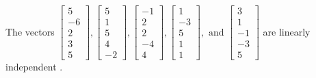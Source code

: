 \begin{exercise}
\begin{exerciseStatement}
  \end{exerciseStatement}
  \begin{exerciseAnswer}
   The vectors \(\left[\begin{array}{r}
5 \\
-6 \\
2 \\
3 \\
5
\end{array}\right] , \left[\begin{array}{r}
5 \\
1 \\
5 \\
4 \\
-2
\end{array}\right] , \left[\begin{array}{r}
-1 \\
2 \\
2 \\
-4 \\
4
\end{array}\right] , \left[\begin{array}{r}
1 \\
-3 \\
5 \\
1 \\
1
\end{array}\right] , \text{ and } \left[\begin{array}{r}
3 \\
1 \\
-1 \\
-3 \\
5
\end{array}\right]\) are 
  	 linearly independent  .
  


  \end{exerciseAnswer}
\end{exercise}